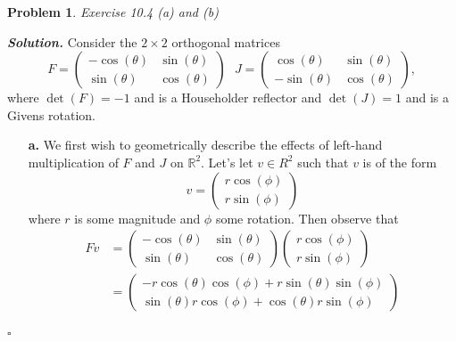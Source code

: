 \documentclass[12pt]{report}
\newtheorem{problem}{Problem}
\newenvironment{solution}[1][\it{Solution}]{\textbf{#1. } }{$\square$}
\def\R{{\mathbb R}}
\begin{document}
\newpage



\begin{problem}
    Exercise 10.4 (a) and (b)
\end{problem}

\begin{solution}
    \noindent
    Consider the $2 \times 2$ orthogonal matrices
    \[ F = 
    \begin{pmatrix}
        -\cos(\theta) & \sin(\theta)\\
        \sin(\theta) & \cos(\theta)
    \end{pmatrix} ~~~ J =
    \begin{pmatrix}
        \cos(\theta) & \sin(\theta)\\
        -\sin(\theta) & \cos(\theta)
    \end{pmatrix},\]
    where $\det(F) = -1$ and is a Householder reflector and $\det(J) = 1$ and is a Givens rotation.
    \begin{enumerate}
        \item [{\bf a.}]
        We first wish to geometrically describe the effects of left-hand multiplication of $F$ and $J$ on $\R^2$. Let's let $v \in R^2$ such that $v$ is of the form
        \[
            v = \begin{pmatrix}
                r\cos(\phi)\\r\sin(\phi)
            \end{pmatrix}
        \]
        where $r$ is some magnitude and $\phi$ some rotation. Then observe that
        \begin{align*}
            Fv &=     \begin{pmatrix}
                -\cos(\theta) & \sin(\theta)\\
                \sin(\theta) & \cos(\theta)
            \end{pmatrix}\begin{pmatrix}
                r\cos(\phi)\\r\sin(\phi)
            \end{pmatrix}\\
            &= \begin{pmatrix}-r\cos \left(\theta\right)\cos \left(\phi\right)+r\sin \left(\theta\right)\sin \left(\phi\right)\\ \sin \left(\theta\right)r\cos \left(\phi\right)+\cos \left(\theta\right)r\sin \left(\phi\right)\end{pmatrix}\\

\end{align*}
\end{enumerate}
\end{solution}
\end{document}
